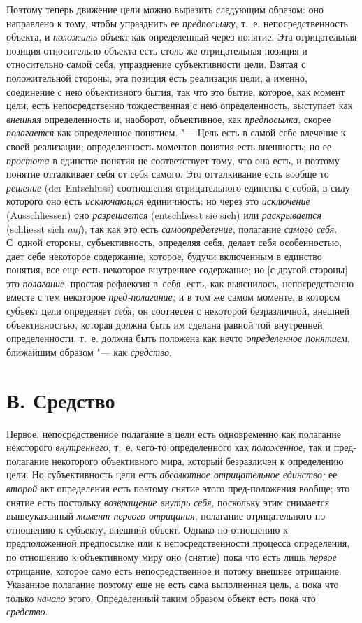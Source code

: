 Поэтому теперь движение цели можно выразить следующим образом: оно направлено
к тому, чтобы упразднить ее {\em предпосылку}, т.~е. непосредственность
объекта, и {\em положить} объект как
определенный через понятие. Эта отрицательная позиция относительно объекта
есть столь же отрицательная позиция и относительно самой себя, упразднение
субъективности цели. Взятая с положительной стороны, эта позиция есть
реализация цели, а именно, соединение с нею объективного бытия, так что это
бытие, которое, как момент цели, есть непосредственно тождественная с нею
определенность, выступает как {\em внешняя}
определенность и, наоборот, объективное, как
{\em предпосылка}, скорее {\em полагается} как
определенное понятием. "--- Цель есть в самой себе влечение к
своей реализации; определенность моментов понятия есть внешность; но ее
{\em простота} в единстве
понятия не соответствует тому, что она есть, и поэтому понятие отталкивает
себя от себя самого. Это отталкивание есть вообще то
{\em решение} (der Entschluss)
соотношения отрицательного единства с собой, в силу которого
оно есть {\em исключающая} единичность: но через это
{\em исключение} (Aus\-schliessen) оно {\em разрешается}
(ent\-schliesst sie sich) или {\em раскрывается} (schliesst sich
{\em auf}), так как это есть {\em самоопределение}, полагание {\em самого
себя}. С~одной стороны, субъективность, определяя себя,
делает себя особенностью, дает себе некоторое содержание, которое, будучи
включенным в единство понятия, все еще есть некоторое внутреннее
содержание; но [с другой стороны] это {\em полагание}, простая
рефлексия в~себя, есть, как выяснилось, непосредственно вместе с тем
некоторое {\em пред-полагание;} и в том же самом моменте, в котором субъект
цели определяет {\em себя}, он соотнесен
с некоторой безразличной, внешней объективностью, которая должна быть им
сделана равной той внутренней определенности, т.~е. должна быть положена как
нечто {\em определенное понятием}, ближайшим образом "--- как {\em средство}.

\section[В. Средство]{В. Средство}

Первое, непосредственное полагание в цели есть одновременно
как полагание некоторого {\em внутреннего}, т.~е.
чего-то определенного как {\em положенное}, так и
пред-полагание некоторого объективного мира, который безразличен к
определению цели. Но субъективность цели есть
{\em абсолютное отрицательное единство;} ее {\em второй} акт
определения есть поэтому снятие этого пред-положения вообще; это
снятие есть постольку {\em возвращение внутрь себя},
поскольку этим снимается вышеуказанный {\em момент первого отрицания},
полагание отрицательного по отношению к субъекту, внешний
объект. Однако по отношению к предположенной предпосылке или к
непосредственности процесса определения, по отношению к объективному миру
оно (снятие) пока что есть лишь {\em первое} отрицание, которое само есть
непосредственное и потому внешнее отрицание. Указанное полагание поэтому еще
не есть сама выполненная цель, а пока что только {\em начало} этого.
Определенный таким образом объект есть пока что {\em средство}.

